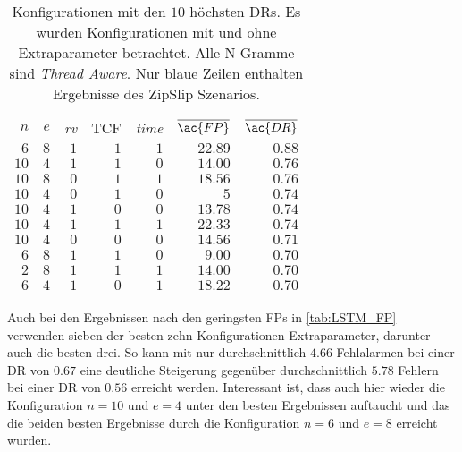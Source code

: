     \begin{table}[ht]
        \centering
        \begin{tabular}{rrrrrrr}
            \hline
            \rowcolor{GruvGray!36}
            \multicolumn{7}{c}{Mit Extraparametern nach \ac{DR}}\\
            \toprule
            $n$ & $e$ & \textit{rv} & \ac{TCF} & \textit{time} & $\overline{\ac{FP}}$ & $\overline{\ac{DR}}$ \\
            \midrule
            \rowcolor{GruvGray!16}
            $6$ & 	$8$ & 	$1$ & 	$1$ & 	$1$ & 	$22.89$ & 	$0.88$ \\
            $10$ & 	$4$ & 	$1$ & 	$1$ & 	$0$ & 	$14.00$ & 	$0.76$ \\
            \rowcolor{GruvGray!16}
            $10$ & 	$8$ & 	$0$ & 	$1$ & 	$1$ & 	$18.56$ & 	$0.76$ \\
            $10$ & 	$4$ & 	$0$ & 	$1$ & 	$0$ & 	$5$ & 	    $0.74$ \\
            \rowcolor{GruvGray!16}
            $10$ & 	$4$ & 	$1$ & 	$0$ & 	$0$ & 	$13.78$ & 	$0.74$ \\
            $10$ & 	$4$ & 	$1$ & 	$1$ & 	$1$ & 	$22.33$ & 	$0.74$ \\
            \rowcolor{GruvGray!16}
            $10$ & 	$4$ & 	$0$ & 	$0$ & 	$0$ & 	$14.56$ & 	$0.71$ \\
            $6$ & 	$8$ & 	$1$ & 	$1$ & 	$0$ & 	$9.00$ & 	    $0.70$ \\
            \rowcolor{GruvGray!16}
            \rowcolor{CTblue!16}
            $2$ & 	$8$ & 	$1$ & 	$1$ & 	$1$ & 	$14.00$ & 	$0.70$ \\
            $6$ & 	$4$ & 	$1$ & 	$0$ & 	$1$ & 	$18.22$ & 	$0.70$ \\
            \hline
        \end{tabular}
        \caption[Ergebnisse nach \ac{DR} mit Extraparametern]{Konfigurationen mit den $10$ höchsten \acp{DR}. 
                 Es wurden Konfigurationen mit und ohne Extraparameter betrachtet.
                 Alle N-Gramme sind \textit{Thread Aware}.
                 Nur blaue Zeilen enthalten Ergebnisse des ZipSlip Szenarios.}
        \label{tab:LSTM_par_erg}
    \end{table}

    Auch bei den Ergebnissen nach den geringsten \acp{FP} in \autoref{tab:LSTM_FP} verwenden sieben der besten zehn Konfigurationen Extraparameter, darunter auch die besten drei.
    So kann mit nur durchschnittlich $4.66$ Fehlalarmen bei einer \ac{DR} von $0.67$ eine deutliche Steigerung gegenüber durchschnittlich $5.78$ Fehlern bei einer \ac{DR} von $0.56$  erreicht werden.
    Interessant ist, dass auch hier wieder die Konfiguration $n=10$ und $e=4$ unter den besten Ergebnissen auftaucht und das die beiden besten Ergebnisse durch die Konfiguration $n=6$ und $e=8$ erreicht wurden.

